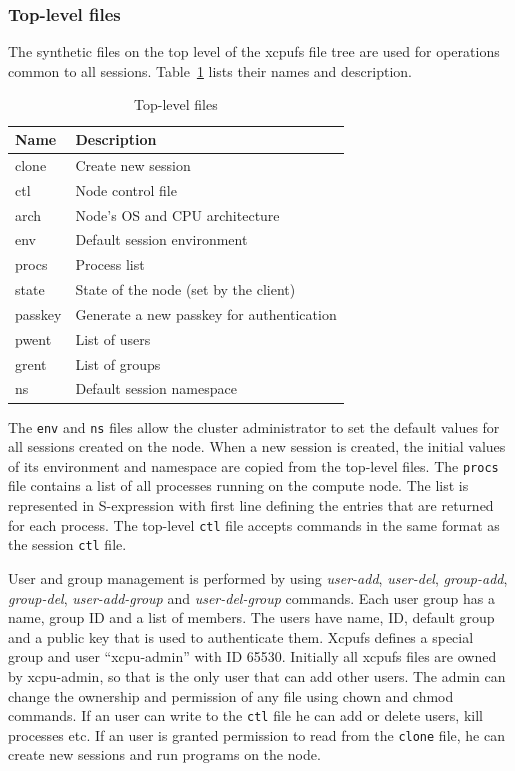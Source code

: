 \documentclass[10pt,conference,letterpaper]{IEEEtran}
\begin{document}
\subsubsection{Top-level files}

The synthetic files on the top level of the xcpufs file tree are used for
operations common to all sessions. Table~\ref{tbl:xcpu2-top} lists their
names and description.

\begin{table}[ht]
\begin{center}
\begin{tabular}{lp{2.4in}}
    Name & Description\\
    \hline
    \ttfamily clone & Create new session\\
    \ttfamily ctl & Node control file\\
    \ttfamily arch & Node's OS and CPU architecture\\
    \ttfamily env & Default session environment\\
    \ttfamily procs & Process list\\
    \ttfamily state & State of the node (set by the client)\\
    \ttfamily passkey & Generate a new passkey for authentication\\
    \ttfamily pwent & List of users\\
    \ttfamily grent & List of groups\\
    \ttfamily ns & Default session namespace\\
\end{tabular}
\caption{Top-level files}
\label{tbl:xcpu2-top}
\end{center}
\end{table}

The \texttt{env} and \texttt{ns} files allow the cluster administrator to
set the default values for all sessions created on the node. When a new
session is created, the initial values of its environment and namespace are
copied from the top-level files. The \texttt{procs} file contains a list of
all processes running on the compute node. The list is represented in
S-expression with first line defining the entries that are returned for each
process. The top-level \texttt{ctl} file accepts commands in the same format
as the session \texttt{ctl} file.

User and group management is performed by using \textsl{user-add},
\textsl{user-del}, \textsl{group-add}, \textsl{group-del},
\textsl{user-add-group} and \textsl{user-del-group} commands. Each user
group has a name, group ID and a list of members. The users have name, ID,
default group and a public key that is used to authenticate them. Xcpufs
defines a special group and user ``xcpu-admin'' with ID 65530. Initially all
xcpufs files are owned by xcpu-admin, so that is the only user that can add
other users. The admin can change the ownership and permission of any file 
using chown and chmod commands. If an user can write to the \texttt{ctl}
file he can add or delete users, kill processes etc. If an user is granted
permission to read from the \texttt{clone} file, he can create new sessions
and run programs on the node.
\end{document}
